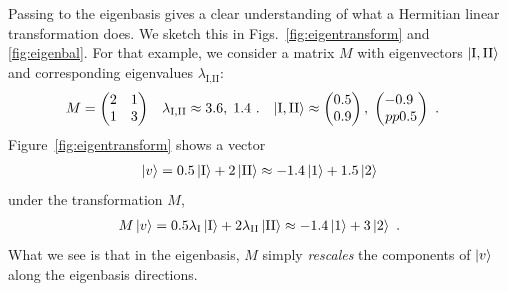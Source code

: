 \documentclass[12pt]{article}
\begin{document}
Passing to the eigenbasis gives a clear understanding of what a Hermitian linear transformation does. We sketch this in Figs.~\ref{fig:eigentransform} and \ref{fig:eigenbal}. For that example, we consider a matrix $M$ with eigenvectors $\left|{\textnormal{I},\textnormal{II}}\right\rangle$ and corresponding eigenvalues $\lambda_{\text{I},\text{II}}$:
\begin{align}
    M &= \begin{pmatrix}
        2 & 1 \\
        1 & 3
    \end{pmatrix}
    &
    \lambda_{\textnormal{I},\textnormal{II}} &\approx 3.6,\; 1.4 \ .
    &
    \left|{\textnormal{I},\textnormal{II}}\right\rangle&\approx
    \begin{pmatrix}
        0.5 \\ 0.9
    \end{pmatrix},
    \;
    \begin{pmatrix}
        -0.9 \ \\pp 0.5
    \end{pmatrix} \ .
\end{align}
Figure~\ref{fig:eigentransform} shows a vector 
\begin{align}
    \left|v\right\rangle = 0.5\left|\textnormal{I}\right\rangle + 2\left|\textnormal{II}\right\rangle \approx
    -1.4\left|1\right\rangle + 1.5 \left|2\right\rangle 
    \label{eq:eigen:example:v}
\end{align}
under the transformation $M$,
\begin{align}
    M\left|v\right\rangle = 0.5\lambda_\textnormal{I}\left|\textnormal{I}\right\rangle + 2 \lambda_\textnormal{II}\left|\textnormal{II}\right\rangle \approx
    -1.4\left|1\right\rangle + 3 \left|2\right\rangle \ .
    \label{eq:eigen:example:Mv}
\end{align}
What we see is that in the eigenbasis, $M$ simply \emph{rescales} the components of $\left|v\right\rangle$ along the eigenbasis directions. 
\end{document}
